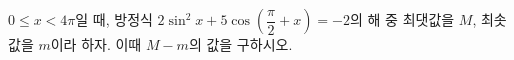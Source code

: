 $0\le x<4\pi$일 때, 방정식 $2\sin^2 x+5\cos\left(\dfrac{\pi}{2}+x\right)=-2$의 해 중 최댓값을 $M$, 최솟값을 $m$이라 하자. 이때 $M-m$의 값을 구하시오.
